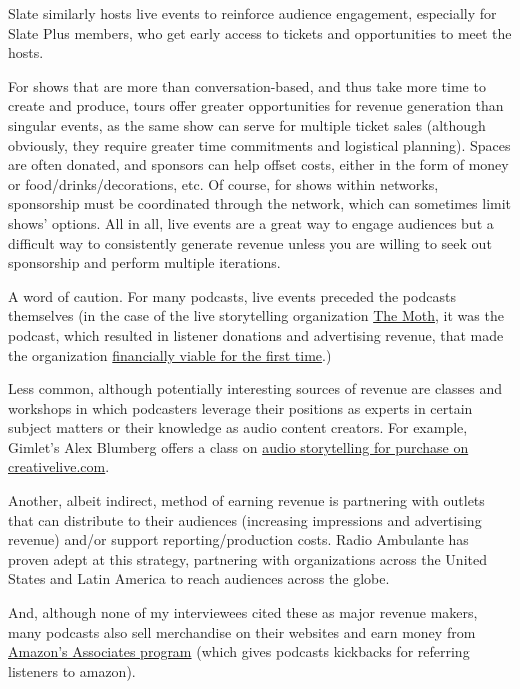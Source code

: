 \documentclass[notoc, symmetric, nobib, nols]{towcenter-guideto-book}
\begin{document}
Slate similarly hosts live events to reinforce audience engagement, especially for Slate Plus members, who get early access to tickets and opportunities to meet the hosts.\autocite{bowers} 

For shows that are more than conversation-based, and thus take more time to create and produce, tours offer greater opportunities for revenue generation than singular events, as the same show can serve for multiple ticket sales (although obviously, they require greater time commitments and logistical planning). Spaces are often donated, and sponsors can help offset costs, either in the form of money or food/drinks/decorations, etc.\autocites{heart, israel} Of course, for shows within networks, sponsorship must be coordinated through the network, which can sometimes limit shows' options. All in all, live events are a great way to engage audiences but a difficult way to consistently generate revenue unless you are willing to seek out sponsorship and perform multiple iterations.

A word of caution. For many podcasts, live events preceded the podcasts themselves (in the case of the live storytelling organization \href{http://themoth.org}{The Moth}, it was the podcast, which resulted in listener donations and advertising revenue, that made the organization \href{http://www.earwolf.com/episode/lea-thau-creator-and-host-of-strangers/}{financially viable for the first time}.)\autocite{lea} 

Less common, although potentially interesting sources of revenue are classes and workshops in which podcasters leverage their positions as experts in certain subject matters or their knowledge as audio content creators. For example, Gimlet's Alex Blumberg offers a class on \href{https://www.creativelive.com/courses/power-your-podcast-storytelling-alex-blumberg}{audio storytelling for purchase on creativelive.com}.  

Another, albeit indirect, method of earning revenue is partnering with outlets that can distribute to their audiences (increasing impressions and advertising revenue) and/or support reporting/production costs. Radio Ambulante has proven adept at this strategy, partnering with organizations across the United States and Latin America to reach audiences across the globe.\autocite{ambulantecs}

And, although none of my interviewees cited these as major revenue makers, many podcasts also sell merchandise on their websites and earn money from \href{https://affiliate-program.amazon.com/gp/associates/join/compensation.html}{Amazon's Associates program} (which gives podcasts kickbacks for referring listeners to amazon).
\end{document}
